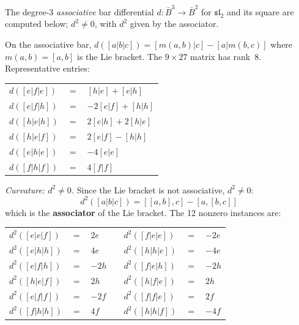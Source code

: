 \begin{computation}
\label{comp:sl2-bar-deg3-curvature}
\ClaimStatusProvedHere
{}

The degree-3 \emph{associative} bar differential
$d\colon \bar{B}^3 \to \bar{B}^2$ for $\mathfrak{sl}_2$ and
its square are computed below; $d^2 \neq 0$, with $d^2$ given by
the associator.

On the associative bar, $d([a|b|c]) = [m(a,b)|c] - [a|m(b,c)]$
where $m(a,b) = [a,b]$ is the Lie bracket. The $9 \times 27$ matrix
has rank~$8$. Representative entries:
\begin{center}
\renewcommand{\arraystretch}{1.2}
\begin{tabular}{lcl}
$d([e|f|e])$ & $=$ & $[h|e] + [e|h]$ \\
$d([e|f|h])$ & $=$ & $-2[e|f] + [h|h]$ \\
$d([h|e|h])$ & $=$ & $2[e|h] + 2[h|e]$ \\
$d([h|e|f])$ & $=$ & $2[e|f] - [h|h]$ \\
$d([e|h|e])$ & $=$ & $-4[e|e]$ \\
$d([f|h|f])$ & $=$ & $4[f|f]$
\end{tabular}
\end{center}

\emph{Curvature: $d^2 \neq 0$.}
Since the Lie bracket is not associative, $d^2 \neq 0$:
\begin{equation}\label{eq:sl2-assoc-bar-d2}
d^2([a|b|c]) = [[a,b],c] - [a,[b,c]]
\end{equation}
which is the \textbf{associator} of the Lie bracket.
The 12 nonzero instances are:
\begin{center}
\renewcommand{\arraystretch}{1.2}
\begin{tabular}{lclclcl}
$d^2([e|e|f])$ & $=$ & $2e$ &\qquad&
 $d^2([f|e|e])$ & $=$ & $-2e$ \\
$d^2([e|h|h])$ & $=$ & $4e$ &&
 $d^2([h|h|e])$ & $=$ & $-4e$ \\
$d^2([e|f|h])$ & $=$ & $-2h$ &&
 $d^2([f|e|h])$ & $=$ & $-2h$ \\
$d^2([h|e|f])$ & $=$ & $2h$ &&
 $d^2([h|f|e])$ & $=$ & $2h$ \\
$d^2([e|f|f])$ & $=$ & $-2f$ &&
 $d^2([f|f|e])$ & $=$ & $2f$ \\
$d^2([f|h|h])$ & $=$ & $4f$ &&
 $d^2([h|h|f])$ & $=$ & $-4f$
\end{tabular}
\end{center}


\end{computation}
